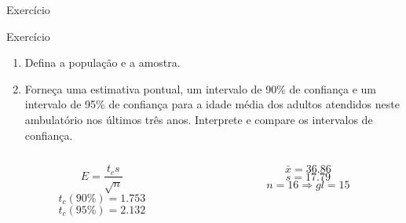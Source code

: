 \documentclass{beamer}
\begin{document}
\begin{frame}{Exercício}
  \begin{block}{Exercício}
    \begin{enumerate}
    \item Defina a população e a amostra.
    \item Forneça uma estimativa pontual, um intervalo de 90\% de
      confiança e um intervalo de 95\% de confiança para a idade média
      dos adultos atendidos neste ambulatório nos últimos três
      anos. Interprete e compare os intervalos de confiança.
    \end{enumerate}
  \end{block}

  \begin{block}{}
    \begin{columns}
      \begin{column}{5cm}
    \begin{displaymath}
      E = \frac{t_c s}{\sqrt{n}}
    \end{displaymath}
    \begin{displaymath}
      t_c (90\%) = 1.753
    \end{displaymath}
    \begin{displaymath}
      t_c (95\%) = 2.132
    \end{displaymath}
  \end{column}
  \begin{column}{5cm}
    \begin{displaymath}
      \bar{x} = 36.86
    \end{displaymath}
    \begin{displaymath}
      s = 17.79
    \end{displaymath}
    \begin{displaymath}
      n = 16 \Rightarrow gl = 15
    \end{displaymath}
  \end{column}
\end{columns}
\end{block}
\end{frame}
\end{document}
